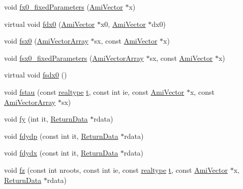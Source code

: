 \begin{DoxyCompactItemize}
\item 
void \mbox{\hyperlink{classamici_1_1_model_ae517574d2a7c504c388438a08a1aed38}{fx0\+\_\+fixed\+Parameters}} (\mbox{\hyperlink{classamici_1_1_ami_vector}{Ami\+Vector}} $\ast$x)
\item 
virtual void \mbox{\hyperlink{classamici_1_1_model_a8c3a1647a75581d9e2fc5de106d87a0d}{fdx0}} (\mbox{\hyperlink{classamici_1_1_ami_vector}{Ami\+Vector}} $\ast$x0, \mbox{\hyperlink{classamici_1_1_ami_vector}{Ami\+Vector}} $\ast$dx0)
\item 
void \mbox{\hyperlink{classamici_1_1_model_a6f46a63f0524ad25e4125254b78fdee9}{fsx0}} (\mbox{\hyperlink{classamici_1_1_ami_vector_array}{Ami\+Vector\+Array}} $\ast$sx, const \mbox{\hyperlink{classamici_1_1_ami_vector}{Ami\+Vector}} $\ast$x)
\item 
void \mbox{\hyperlink{classamici_1_1_model_acd951497e01220e545bbb238cc48e7bb}{fsx0\+\_\+fixed\+Parameters}} (\mbox{\hyperlink{classamici_1_1_ami_vector_array}{Ami\+Vector\+Array}} $\ast$sx, const \mbox{\hyperlink{classamici_1_1_ami_vector}{Ami\+Vector}} $\ast$x)
\item 
virtual void \mbox{\hyperlink{classamici_1_1_model_a946b60982bd7321bcc2bdae10ea8358f}{fsdx0}} ()
\item 
void \mbox{\hyperlink{classamici_1_1_model_a382cd2049c70f0dd4aafe483e4a50cff}{fstau}} (const \mbox{\hyperlink{namespaceamici_a1bdce28051d6a53868f7ccbf5f2c14a3}{realtype}} \mbox{\hyperlink{classamici_1_1_model_a711281d57e9710226face29151cc4641}{t}}, const int ie, const \mbox{\hyperlink{classamici_1_1_ami_vector}{Ami\+Vector}} $\ast$x, const \mbox{\hyperlink{classamici_1_1_ami_vector_array}{Ami\+Vector\+Array}} $\ast$sx)
\item 
void \mbox{\hyperlink{classamici_1_1_model_acd37693bbc14eead48d9a40c72f42a89}{fy}} (int it, \mbox{\hyperlink{classamici_1_1_return_data}{Return\+Data}} $\ast$rdata)
\item 
void \mbox{\hyperlink{classamici_1_1_model_a884ccb083130cb1af7ebe93f7a6d361a}{fdydp}} (const int it, \mbox{\hyperlink{classamici_1_1_return_data}{Return\+Data}} $\ast$rdata)
\item 
void \mbox{\hyperlink{classamici_1_1_model_a3ec46e89aed7bd191fb21ac3e501edd2}{fdydx}} (const int it, \mbox{\hyperlink{classamici_1_1_return_data}{Return\+Data}} $\ast$rdata)
\item 
void \mbox{\hyperlink{classamici_1_1_model_a34f0ec7e922c0817b08d0021dba9c36f}{fz}} (const int nroots, const int ie, const \mbox{\hyperlink{namespaceamici_a1bdce28051d6a53868f7ccbf5f2c14a3}{realtype}} \mbox{\hyperlink{classamici_1_1_model_a711281d57e9710226face29151cc4641}{t}}, const \mbox{\hyperlink{classamici_1_1_ami_vector}{Ami\+Vector}} $\ast$x, \mbox{\hyperlink{classamici_1_1_return_data}{Return\+Data}} $\ast$rdata)

\end{DoxyCompactItemize}
